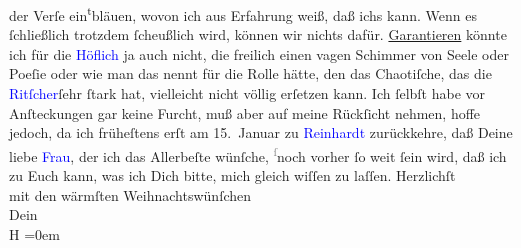               der Verſe ein\substVorne{}\textsuperscript{t}\substDazwischen{}b\substHinten{}läuen, wovon ich aus Erfahrung weiß, daß ichs kann. Wenn es ſchließlich
               trotzdem ſcheußlich wird, können wir nichts {\pb}dafür.
                  \uline{Garantieren} könnte ich für die \textcolor{blue}{Höflich}{}\ledrightnote{\textcolor{blue}{Lucie Höflich}} ja auch nicht, die freilich einen vagen Schimmer von
               Seele oder Poeſie oder wie man das nennt für die Rolle hätte, den das Chaotiſche, das
               die \textcolor{blue}{Ritſcher}{}\ledrightnote{\textcolor{blue}{Helene Ritscher}}{ }ſehr ſtark hat, vielleicht nicht
               völlig erſetzen kann.\pend
           \pstart
           Ich ſelbſt habe vor Anſteckungen gar keine Furcht, muß aber auf meine \label{K_L01744_1v}\label{K_L01744_1h} Rückſicht nehmen, hoffe jedoch, da ich
               früheſtens erſt am 15. Januar zu \textcolor{blue}{Reinhardt}{}\ledrightnote{\textcolor{blue}{Max Reinhardt}} zurückkehre, daß Deine {\pb}liebe
                  \textcolor{blue}{Frau}{}, der ich das Allerbeſte
               wünſche, \substVorne{}\textsuperscript{\textcolor{gray}{ſ}}\substDazwischen{}n\substHinten{}och vorher ſo weit ſein wird, daß ich zu Euch kann, was ich Dich bitte, mich gleich wiſſen zu
               laſſen.\pend
           \pstart
           Herzlichſt{\\[\baselineskip]}mit den wärmſten Weihnachtswünſchen{\\[\baselineskip]}Dein{\\[\baselineskip]}\spacefill\mbox{H}\pend
           \leftskip=0em{}\endnumbering{}  
      